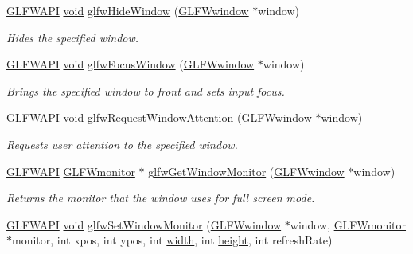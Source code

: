 \begin{DoxyCompactItemize}
\mbox{\hyperlink{glfw3_8h_a56da5036b2cc259351ae22fd6439bb47}{G\+L\+F\+W\+A\+PI}} \mbox{\hyperlink{glad_8h_a950fc91edb4504f62f1c577bf4727c29}{void}} \mbox{\hyperlink{group__window_gaa17e287d521544bdeceafa09ac036e20}{glfw\+Hide\+Window}} (\mbox{\hyperlink{group__window_ga3c96d80d363e67d13a41b5d1821f3242}{G\+L\+F\+Wwindow}} $\ast$window)
\begin{DoxyCompactList}\small\item\em Hides the specified window. \end{DoxyCompactList}\item 
\mbox{\hyperlink{glfw3_8h_a56da5036b2cc259351ae22fd6439bb47}{G\+L\+F\+W\+A\+PI}} \mbox{\hyperlink{glad_8h_a950fc91edb4504f62f1c577bf4727c29}{void}} \mbox{\hyperlink{group__window_ga0da0e3daaa2d100f44a115c09077b510}{glfw\+Focus\+Window}} (\mbox{\hyperlink{group__window_ga3c96d80d363e67d13a41b5d1821f3242}{G\+L\+F\+Wwindow}} $\ast$window)
\begin{DoxyCompactList}\small\item\em Brings the specified window to front and sets input focus. \end{DoxyCompactList}\item 
\mbox{\hyperlink{glfw3_8h_a56da5036b2cc259351ae22fd6439bb47}{G\+L\+F\+W\+A\+PI}} \mbox{\hyperlink{glad_8h_a950fc91edb4504f62f1c577bf4727c29}{void}} \mbox{\hyperlink{group__window_gad0c9629abb49447bedd28080642b8538}{glfw\+Request\+Window\+Attention}} (\mbox{\hyperlink{group__window_ga3c96d80d363e67d13a41b5d1821f3242}{G\+L\+F\+Wwindow}} $\ast$window)
\begin{DoxyCompactList}\small\item\em Requests user attention to the specified window. \end{DoxyCompactList}\item 
\mbox{\hyperlink{glfw3_8h_a56da5036b2cc259351ae22fd6439bb47}{G\+L\+F\+W\+A\+PI}} \mbox{\hyperlink{group__monitor_ga8d9efd1cde9426692c73fe40437d0ae3}{G\+L\+F\+Wmonitor}} $\ast$ \mbox{\hyperlink{group__window_gaf1525cb3bccd5789c702cc9676ef3403}{glfw\+Get\+Window\+Monitor}} (\mbox{\hyperlink{group__window_ga3c96d80d363e67d13a41b5d1821f3242}{G\+L\+F\+Wwindow}} $\ast$window)
\begin{DoxyCompactList}\small\item\em Returns the monitor that the window uses for full screen mode. \end{DoxyCompactList}\item 
\mbox{\hyperlink{glfw3_8h_a56da5036b2cc259351ae22fd6439bb47}{G\+L\+F\+W\+A\+PI}} \mbox{\hyperlink{glad_8h_a950fc91edb4504f62f1c577bf4727c29}{void}} \mbox{\hyperlink{group__window_ga12fabf78575e59c00f822f323ae0b6ae}{glfw\+Set\+Window\+Monitor}} (\mbox{\hyperlink{group__window_ga3c96d80d363e67d13a41b5d1821f3242}{G\+L\+F\+Wwindow}} $\ast$window, \mbox{\hyperlink{group__monitor_ga8d9efd1cde9426692c73fe40437d0ae3}{G\+L\+F\+Wmonitor}} $\ast$monitor, int xpos, int ypos, int \mbox{\hyperlink{glad_8h_a09012ea95ebbbe1c032db7c68b54291e}{width}}, int \mbox{\hyperlink{glad_8h_a456943498a720df0f4b62bafa5dad93c}{height}}, int refresh\+Rate)

\end{DoxyCompactItemize}
